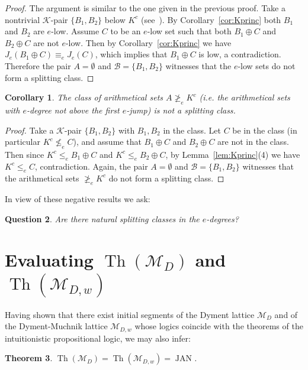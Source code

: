 \documentclass[11pt]{amsart}
\newtheorem{theorem}{Theorem}[section]
\newtheorem{corollary}[theorem]{Corollary}
\newtheorem{question}[theorem]{Question}
\newcommand{\Th}{\operatorname{Th}}
\newcommand{\JAN}{\operatorname{JAN}}
\begin{document}
\begin{proof}
The argument is similar to the one given in the previous proof. Take a 
nontrivial $\mathcal{K}$-pair $\{B_1, B_2\}$ below $K^c$ 
(see~\cite{Kalimullin}). By Corollary~\ref{cor:Kprinc} both $B_1$ and $B_2$ 
are $e$-low. Assume $C$ to be an $e$-low set such that both $B_1 \oplus C$ 
and $B_2 \oplus C$ are not $e$-low. Then by Corollary~\ref{cor:Kprinc} we 
have $J_e(B_1 \oplus C)\equiv_e J_e(C)$, which implies that $B_1 \oplus C$ is 
low, a contradiction. Therefore the pair $A=\emptyset$ and 
$\mathcal{B}=\{B_1,B_2\}$ witnesses that the $e$-low sets do not form a 
splitting class.   
\end{proof}

\begin{corollary}\label{cor:arithmetical}
The class of arithmetical sets $A\ngeq_e K^c$ (i.e. the arithmetical sets 
with $e$-degree not above the first $e$-jump) is not a splitting class. 
\end{corollary}

\begin{proof}
Take a $\mathcal{K}$-pair $\{B_1, B_2\}$ with $B_1, B_2$ in the class. Let 
$C$ be in the class (in particular $K^c \nleq_e C$), and assume that 
$B_1\oplus C$ and $B_2 \oplus C$ are not in the class. Then since $K^c\leq_e 
B_1\oplus C$ and $K^c\leq_e B_2\oplus C$, by Lemma~\ref{lem:Kprinc}(4) we 
have $K^c\leq_e C$, contradiction. Again, the pair $A=\emptyset$ and 
$\mathcal{B}=\{B_1,B_2\}$ witnesses that the arithmetical sets $\ngeq_e 
K^c$ do not form a splitting class. 
\end{proof}

In view of these negative results we ask:

\begin{question}
Are there natural splitting classes in the $e$-degrees?
\end{question}

\section{Evaluating $\Th(\mathscr{M}_{D})$ and 
$\Th(\mathscr{M}_{D,w})$}\label{sec:total} 

Having shown that there exist initial segments of the Dyment lattice 
$\mathscr{M}_D$ and of the Dyment-Muchnik lattice $\mathscr{M}_{D,w}$ whose 
logics coincide with the theorems of the intuitionistic propositional logic, 
we may also infer: 

\begin{theorem} 
$\Th(\mathscr{M}_{D})=\Th(\mathscr{M}_{D,w})=\JAN$. 
\end{theorem} 
\end{document}
